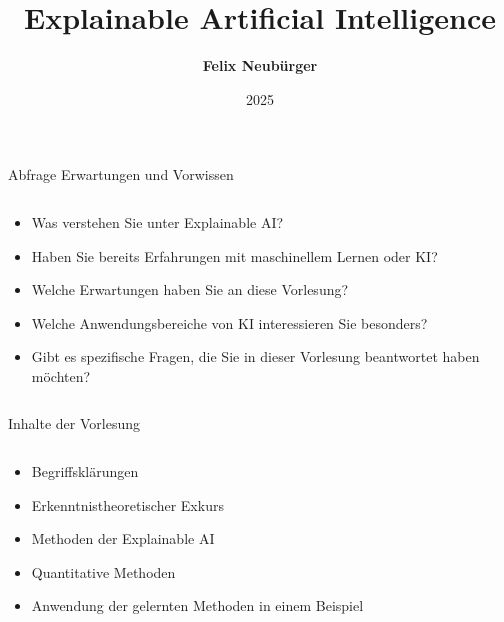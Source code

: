 \documentclass[aspectratio=1610, xcolor=dvipsnames, 9pt]{beamer}
\title{Explainable Artificial Intelligence}
\author[F.~Neubürger]{ \textbf{Felix Neubürger}}
\institute[I \& W]{Fachhochschule Südwestfalen, Ingenieurs- \& Wirtschaftswissenschaften}
\date{2025}
\begin{document}
\maketitle
\begin{frame}{Abfrage Erwartungen und Vorwissen}
  \begin{columns}
    \begin{column}{1\textwidth}
      \begin{itemize}
        \item Was verstehen Sie unter Explainable AI? \newline
        \item Haben Sie bereits Erfahrungen mit maschinellem Lernen oder KI? \newline
        \item Welche Erwartungen haben Sie an diese Vorlesung? \newline
        \item Welche Anwendungsbereiche von KI interessieren Sie besonders? \newline
        \item Gibt es spezifische Fragen, die Sie in dieser Vorlesung beantwortet haben möchten?
      \end{itemize}
    \end{column}
    \begin{column}{0\textwidth}
    \end{column}
  \end{columns}
\end{frame}

\begin{frame}{Inhalte der Vorlesung}
  \begin{columns}
    \begin{column}{1\textwidth}
      \begin{itemize}
        \item Begriffsklärungen\newline
        \item Erkenntnistheoretischer Exkurs \newline
        \item Methoden der Explainable AI  \newline
        \item Quantitative Methoden \newline 
        \item Anwendung der gelernten Methoden in einem Beispiel
      \end{itemize}
    \end{column}
    \begin{column}{0\textwidth}
    \end{column}
  \end{columns}
\end{frame}
\end{document}
